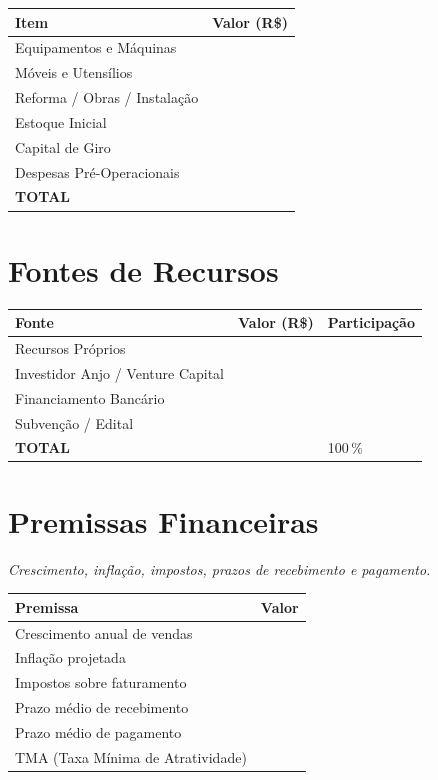 \documentclass[
	12pt,
	openright,
	oneside,
	a4paper,
	chapter=TITLE,
	section=TITLE,
	english,
	brazil
	]{abntex2}
\newcommand{\tcampo}[1]{%
	{#1}%
}
\newcommand{\instrucao}[1]{%
	\vspace{0.3cm}%
	\noindent%
	{%
		\setlength{\fboxsep}{6pt}%
		\colorbox{azul-claro}{%
			\begin{minipage}{\dimexpr\textwidth-2\fboxsep\relax}%
				\setlength{\parindent}{1.25cm}%
				{\color{cinza-instrucao}\small\itshape #1}%
			\end{minipage}%
		}%
	}%
	\vspace{0.3cm}%
}
\begin{document}
\centering
\begin{tabularx}{\textwidth}{X r}
\toprule
\rowcolor{azul-claro}
\textbf{Item} & \textbf{Valor (R\$)} \\
\midrule
Equipamentos e Máquinas       & \tcampo{} \\
Móveis e Utensílios           & \tcampo{} \\
Reforma / Obras / Instalação  & \tcampo{} \\
Estoque Inicial               & \tcampo{} \\
Capital de Giro               & \tcampo{} \\
Despesas Pré-Operacionais     & \tcampo{} \\
\midrule
\textbf{TOTAL}                & \tcampo{} \\
\bottomrule
\end{tabularx}
\label{tab:investimento-inicial}

\section{Fontes de Recursos}

\centering
\begin{tabularx}{\textwidth}{X r X}
\toprule
\rowcolor{azul-claro}
\textbf{Fonte} & \textbf{Valor (R\$)} & \textbf{Participação} \\
\midrule
Recursos Próprios                  & \tcampo{} & \tcampo{} \\
Investidor Anjo / Venture Capital  & \tcampo{} & \tcampo{} \\
Financiamento Bancário             & \tcampo{} & \tcampo{} \\
Subvenção / Edital                 & \tcampo{} & \tcampo{} \\
\midrule
\textbf{TOTAL}                     & \tcampo{} & 100\,\% \\
\bottomrule
\end{tabularx}

\section{Premissas Financeiras}

\instrucao{Crescimento, inflação, impostos, prazos de recebimento e pagamento.}

\centering
\begin{tabularx}{\textwidth}{X X}
\toprule
\rowcolor{azul-claro}
\textbf{Premissa} & \textbf{Valor} \\
\midrule
Crescimento anual de vendas           & \tcampo{} \\
Inflação projetada                    & \tcampo{} \\
Impostos sobre faturamento            & \tcampo{} \\
Prazo médio de recebimento            & \tcampo{} \\
Prazo médio de pagamento              & \tcampo{} \\
TMA (Taxa Mínima de Atratividade)     & \tcampo{} \\
\bottomrule
\end{tabularx}
\end{document}
